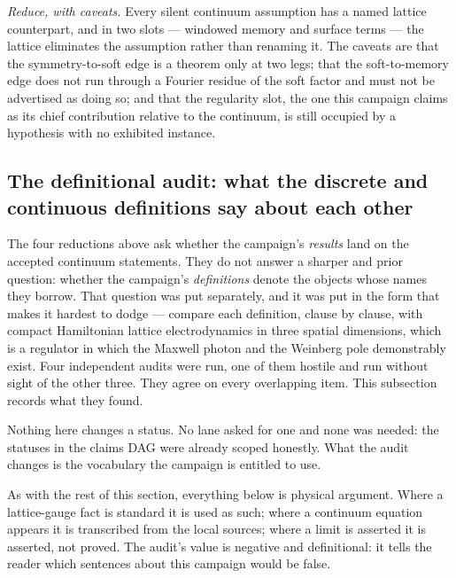 \begin{observation}
\label{obs:verdict-edges}
\emph{Reduce, with caveats.} Every silent continuum assumption has a named
lattice counterpart, and in two slots --- windowed memory and surface terms ---
the lattice eliminates the assumption rather than renaming it. The caveats are
that the symmetry-to-soft edge is a theorem only at two legs; that the
soft-to-memory edge does not run through a Fourier residue of the soft factor
and must not be advertised as doing so; and that the regularity slot, the one
this campaign claims as its chief contribution relative to the continuum, is
still occupied by a hypothesis with no exhibited instance.
\end{observation}

\subsection{The definitional audit: what the discrete and continuous
definitions say about each other}
\label{sec:reduction-defaudit}

The four reductions above ask whether the campaign's \emph{results} land on the
accepted continuum statements. They do not answer a sharper and prior question:
whether the campaign's \emph{definitions} denote the objects whose names they
borrow. That question was put separately, and it was put in the form that makes
it hardest to dodge --- compare each definition, clause by clause, with compact
Hamiltonian lattice electrodynamics in three spatial dimensions, which is a
regulator in which the Maxwell photon and the Weinberg pole demonstrably exist.
Four independent audits were run, one of them hostile and run without sight of
the other three. They agree on every overlapping item. This subsection records
what they found.

Nothing here changes a status. No lane asked for one and none was needed: the
statuses in the claims DAG were already scoped honestly. What the audit changes
is the vocabulary the campaign is entitled to use.

\begin{remark}
\label{rem:defaudit-register}
As with the rest of this section, everything below is physical argument. Where
a lattice-gauge fact is standard it is used as such; where a continuum equation
appears it is transcribed from the local sources; where a limit is asserted it
is asserted, not proved. The audit's value is negative and definitional: it
tells the reader which sentences about this campaign would be false.
\end{remark}

